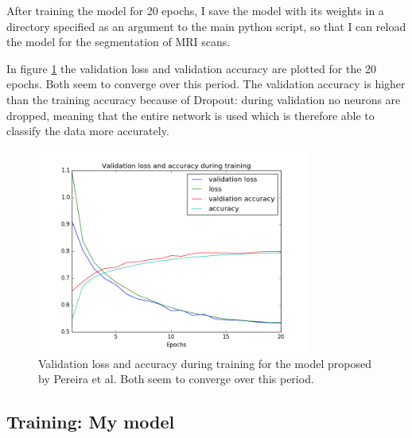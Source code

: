 \documentclass[12pt,a4paper,twoside,openright]{report}
\begin{document}
After training the model for 20 epochs, I save the model with its weights in a directory specified as an argument to the main python script, so that I can reload the model for the segmentation of MRI scans. 

In figure \ref{fig:pereira_validation_loss} the validation loss and validation accuracy are plotted for the 20 epochs. Both seem to converge over this period. The validation accuracy is higher than the training accuracy because of Dropout: during validation no neurons are dropped, meaning that the entire network is used which is therefore able to classify the data more accurately.

\begin{figure}
	\centering
	\includegraphics[width=0.8\textwidth]{pereira_validation_loss}
	\caption[Validation loss and accuracy during training for the model proposed by Pereira et al.]{Validation loss and accuracy during training for the model proposed by Pereira et al. Both seem to converge over this period.}
	\label{fig:pereira_validation_loss}
\end{figure}

\subsection{Training: My model}
\end{document}
